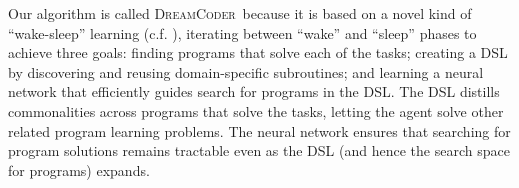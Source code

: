 \documentclass{article}
\newcommand{\system}{\textsc{DreamCoder}~}
\newcommand{\systemEnding}{\textsc{DreamCoder}}
\begin{document}
Our algorithm is called \system because it is based on a
novel kind of ``wake-sleep'' learning (c.f. \cite{hinton1995wake}), iterating
between ``wake'' and ``sleep'' phases to achieve three goals: finding
programs that solve each of the tasks; creating a DSL by discovering
and reusing domain-specific subroutines; and learning a neural network
that efficiently guides search for programs in the DSL. The DSL
distills commonalities across programs that solve the tasks, letting
the agent solve other related program learning problems. The neural
network ensures that searching for program solutions remains tractable
even as the DSL (and hence the search space for programs) expands.





\end{document}
